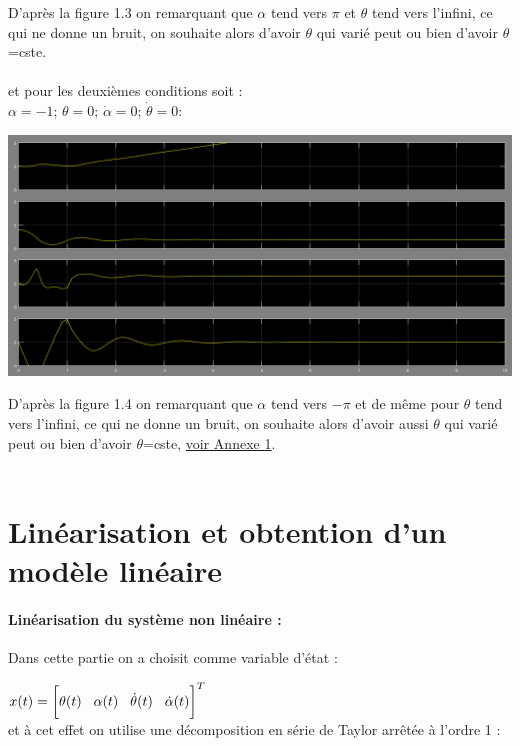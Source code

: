 \documentclass[12pt, a4paper, openany]{report}
\begin{document}
D’après la figure 1.3 on remarquant que $\alpha$ tend vers $\pi$ et $\theta$
tend vers l'infini, ce qui ne donne un bruit, on souhaite alors d'avoir $\theta$ qui varié peut ou bien d'avoir $\theta$=cste.\\\\  
 
et pour les deuxièmes conditions soit :\\
$\alpha=-1$; $\theta=0$; $\dot{\alpha}=0$; $\dot{\theta} = 0:$ \\
                                                   
\begin{center}
\includegraphics[scale=0.4]{alpha=-1.PNG}
\label{fig1} 
\end{center}

D’après la figure 1.4 on remarquant que $\alpha$ tend vers $-\pi$ et de même pour $\theta$
tend vers l'infini, ce qui ne donne un bruit, on souhaite alors d'avoir aussi $\theta$ qui varié peut ou bien d'avoir $\theta$=cste, \hyperref[section1.1]{voir Annexe 1}\label{annexe1}.\\\\

\section{Linéarisation et obtention d'un modèle linéaire}
\paragraph{Linéarisation du système non linéaire :\\}
Dans cette partie on a choisit comme variable d'état :

 $x(t)=\bigg[\theta(t)\hspace{3mm}\alpha(t)\hspace{3mm} \dot{\theta}(t)\hspace{3mm} \dot{\alpha}(t)\bigg]^{T}$ \\  
   et à cet effet on utilise une décomposition en série de Taylor arrêtée à l'ordre 1 :\\
   
\end{document}
